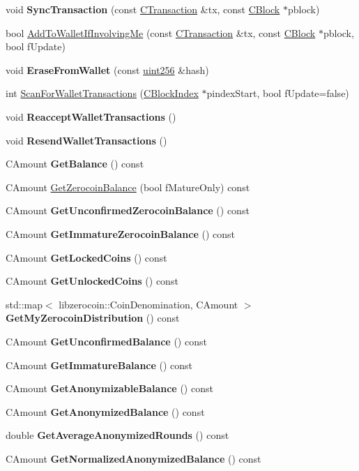 \begin{DoxyCompactItemize}
void {\bfseries Sync\+Transaction} (const \mbox{\hyperlink{class_c_transaction}{C\+Transaction}} \&tx, const \mbox{\hyperlink{class_c_block}{C\+Block}} $\ast$pblock)
\item 
bool \mbox{\hyperlink{group__map_wallet_ga487f7cba517d37d24e5fa422711574d9}{Add\+To\+Wallet\+If\+Involving\+Me}} (const \mbox{\hyperlink{class_c_transaction}{C\+Transaction}} \&tx, const \mbox{\hyperlink{class_c_block}{C\+Block}} $\ast$pblock, bool f\+Update)
\item 
void {\bfseries Erase\+From\+Wallet} (const \mbox{\hyperlink{classuint256}{uint256}} \&hash)
\item 
int \mbox{\hyperlink{group__map_wallet_ga979a17e80e4897ed1f4ae9a4be7c493c}{Scan\+For\+Wallet\+Transactions}} (\mbox{\hyperlink{class_c_block_index}{C\+Block\+Index}} $\ast$pindex\+Start, bool f\+Update=false)
\item 
void {\bfseries Reaccept\+Wallet\+Transactions} ()
\item 
void {\bfseries Resend\+Wallet\+Transactions} ()
\item 
C\+Amount {\bfseries Get\+Balance} () const
\item 
C\+Amount \mbox{\hyperlink{group___actions_gaba22138d6c6eabe35feed7570a78ee7d}{Get\+Zerocoin\+Balance}} (bool f\+Mature\+Only) const
\item 
C\+Amount {\bfseries Get\+Unconfirmed\+Zerocoin\+Balance} () const
\item 
C\+Amount {\bfseries Get\+Immature\+Zerocoin\+Balance} () const
\item 
C\+Amount {\bfseries Get\+Locked\+Coins} () const
\item 
C\+Amount {\bfseries Get\+Unlocked\+Coins} () const
\item 
std\+::map$<$ libzerocoin\+::\+Coin\+Denomination, C\+Amount $>$ {\bfseries Get\+My\+Zerocoin\+Distribution} () const
\item 
C\+Amount {\bfseries Get\+Unconfirmed\+Balance} () const
\item 
C\+Amount {\bfseries Get\+Immature\+Balance} () const
\item 
C\+Amount {\bfseries Get\+Anonymizable\+Balance} () const
\item 
C\+Amount {\bfseries Get\+Anonymized\+Balance} () const
\item 
double {\bfseries Get\+Average\+Anonymized\+Rounds} () const
\item 
C\+Amount {\bfseries Get\+Normalized\+Anonymized\+Balance} () const
\item 

\end{DoxyCompactItemize}
